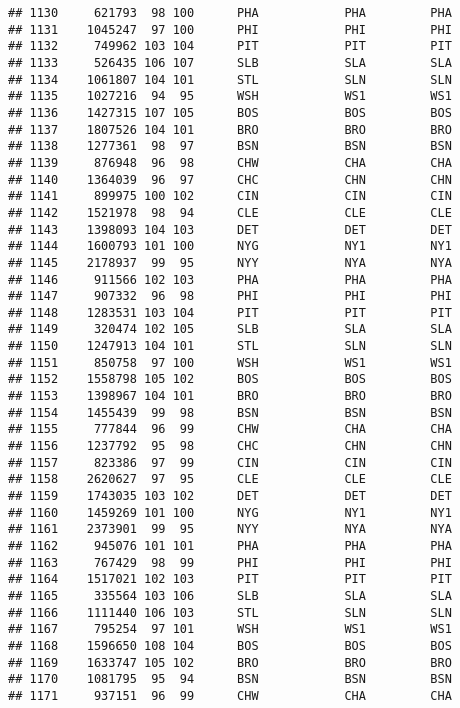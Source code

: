 \documentclass[]{article}
\begin{document}
\begin{verbatim}
## 1130     621793  98 100      PHA            PHA         PHA
## 1131    1045247  97 100      PHI            PHI         PHI
## 1132     749962 103 104      PIT            PIT         PIT
## 1133     526435 106 107      SLB            SLA         SLA
## 1134    1061807 104 101      STL            SLN         SLN
## 1135    1027216  94  95      WSH            WS1         WS1
## 1136    1427315 107 105      BOS            BOS         BOS
## 1137    1807526 104 101      BRO            BRO         BRO
## 1138    1277361  98  97      BSN            BSN         BSN
## 1139     876948  96  98      CHW            CHA         CHA
## 1140    1364039  96  97      CHC            CHN         CHN
## 1141     899975 100 102      CIN            CIN         CIN
## 1142    1521978  98  94      CLE            CLE         CLE
## 1143    1398093 104 103      DET            DET         DET
## 1144    1600793 101 100      NYG            NY1         NY1
## 1145    2178937  99  95      NYY            NYA         NYA
## 1146     911566 102 103      PHA            PHA         PHA
## 1147     907332  96  98      PHI            PHI         PHI
## 1148    1283531 103 104      PIT            PIT         PIT
## 1149     320474 102 105      SLB            SLA         SLA
## 1150    1247913 104 101      STL            SLN         SLN
## 1151     850758  97 100      WSH            WS1         WS1
## 1152    1558798 105 102      BOS            BOS         BOS
## 1153    1398967 104 101      BRO            BRO         BRO
## 1154    1455439  99  98      BSN            BSN         BSN
## 1155     777844  96  99      CHW            CHA         CHA
## 1156    1237792  95  98      CHC            CHN         CHN
## 1157     823386  97  99      CIN            CIN         CIN
## 1158    2620627  97  95      CLE            CLE         CLE
## 1159    1743035 103 102      DET            DET         DET
## 1160    1459269 101 100      NYG            NY1         NY1
## 1161    2373901  99  95      NYY            NYA         NYA
## 1162     945076 101 101      PHA            PHA         PHA
## 1163     767429  98  99      PHI            PHI         PHI
## 1164    1517021 102 103      PIT            PIT         PIT
## 1165     335564 103 106      SLB            SLA         SLA
## 1166    1111440 106 103      STL            SLN         SLN
## 1167     795254  97 101      WSH            WS1         WS1
## 1168    1596650 108 104      BOS            BOS         BOS
## 1169    1633747 105 102      BRO            BRO         BRO
## 1170    1081795  95  94      BSN            BSN         BSN
## 1171     937151  96  99      CHW            CHA         CHA

\end{verbatim}
\end{document}
